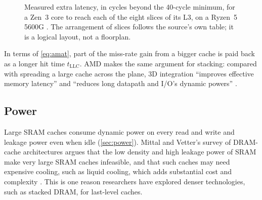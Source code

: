 \begin{figure}[htbp]
\centering
{}
\caption[Extra latency to each L3 slice of a Zen~3 core (Ryzen~5 5600G)]{Measured extra latency, in cycles beyond the 40-cycle minimum, for a Zen~3 core to reach each of the eight slices of its L3, on a Ryzen~5 5600G \cite{7-cpu.comAMDZen3}. The arrangement of slices follows the source's own table; it is a logical layout, not a floorplan.}
\label{fig:l3-slices}
\end{figure}

 In terms of \cref{eq:amat}, part of the miss-rate gain from a bigger cache is paid back as a longer hit time $t_{\mathrm{LLC}}$. AMD makes the same argument for stacking: compared with spreading a large cache across the plane, 3D integration ``improves effective memory latency'' and ``reduces long datapath and I/O's dynamic powers'' \cite[slide~7]{wuu2022vcache}.

\subsection{Power}
Large SRAM caches consume dynamic power on every read and write and leakage power even when idle (\cref{sec:power}). Mittal and Vetter's survey of DRAM-cache architectures argues that the low density and high leakage power of SRAM make very large SRAM caches infeasible, and that such caches may need expensive cooling, such as liquid cooling, which adds substantial cost and complexity \cite[sec.~1]{mittalSurveyTechniquesArchitecting2016}. This is one reason researchers have explored denser technologies, such as stacked DRAM, for last-level caches.

